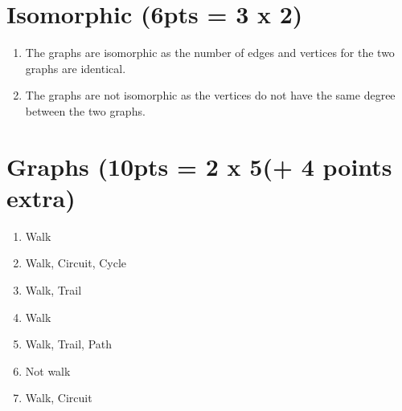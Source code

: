 \documentclass[a4paper]{article}
\begin{document}
\bigskip %

\section{Isomorphic (6pts = 3 x 2)}
\begin{enumerate}
    \item The graphs are isomorphic as the number of edges and vertices for the two graphs are identical.
    \item The graphs are not isomorphic as the vertices do not have the same degree between the two graphs.
\end{enumerate}

\bigskip %

\section{Graphs (10pts = 2 x 5(+ 4 points extra)}
\begin{enumerate}
    \item Walk
    \item Walk, Circuit, Cycle
    \item Walk, Trail
    \item Walk
    \item Walk, Trail, Path
    \item Not walk
    \item Walk, Circuit
\end{enumerate}
\end{document}
